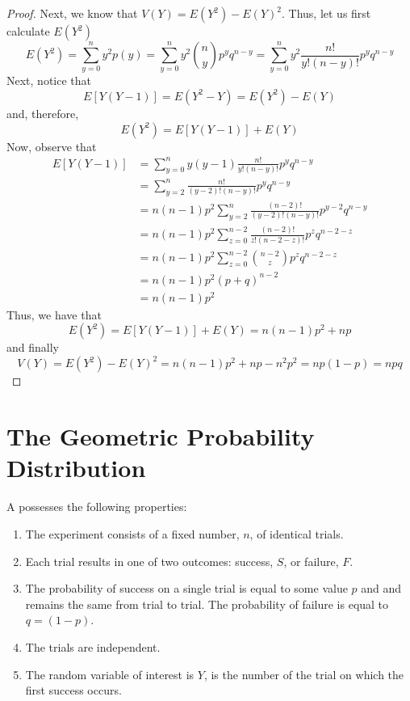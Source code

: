 \documentclass[12pt, a4paper, twoside, openright, titlepage]{book}
\begin{document}
\begin{proof}{}{}
    Next, we know that $V(Y) = E(Y^2) - E(Y)^2$. Thus, let us first calculate $E(Y^2)$ \begin{equation*}
        E(Y^2) = \sum\limits_{y=0}^ny^2p(y) = \sum\limits_{y=0}^ny^2\binom{n}{y}p^yq^{n-y} = \sum\limits_{y=0}^ny^2\frac{n!}{y!(n-y)!}p^yq^{n-y}
    \end{equation*}
    Next, notice that \begin{equation*}
        E[Y(Y-1)] = E(Y^2-Y) = E(Y^2)-E(Y)
    \end{equation*}
    and, therefore, \begin{equation*}
        E(Y^2) = E[Y(Y-1)] + E(Y)
    \end{equation*}
    Now, observe that \begin{align*}
        E[Y(Y-1)] &= \sum\limits_{y=0}^ny(y-1)\frac{n!}{y!(n-y)!}p^yq^{n-y} \\
        &= \sum\limits_{y=2}^n\frac{n!}{(y-2)!(n-y)!}p^yq^{n-y} \\
        &= n(n-1)p^2\sum\limits_{y=2}^n\frac{(n-2)!}{(y-2)!(n-y)!}p^{y-2}q^{n-y} \\
        &= n(n-1)p^2\sum\limits_{z=0}^{n-2}\frac{(n-2)!}{z!(n-2-z)!}p^zq^{n-2-z} \\
        &= n(n-1)p^2\sum\limits_{z=0}^{n-2}\binom{n-2}{z}p^zq^{n-2-z} \\
        &= n(n-1)p^2(p+q)^{n-2} \\
        &= n(n-1)p^2
    \end{align*}
    Thus, we have that \begin{equation*}
        E(Y^2) = E[Y(Y-1)]+E(Y) = n(n-1)p^2+np
    \end{equation*}
    and finally \begin{equation*}
        V(Y) = E(Y^2)-E(Y)^2 = n(n-1)p^2+np-n^2p^2 = np(1-p) = npq
    \end{equation*}
\end{proof}


\section{\textsection The Geometric Probability Distribution}

\begin{defn}{}{}
    A  possesses the following properties: \begin{enumerate}
        \item The experiment consists of a fixed number, $n$, of identical trials.
        \item Each trial results in one of two outcomes: success, $S$, or failure, $F$.
        \item The probability of success on a single trial is equal to some value $p$ and and remains the same from trial to trial. The probability of failure is equal to $q = (1-p)$.
        \item The trials are independent.
        \item The random variable of interest is $Y$, is the number of the trial on which the first success occurs.
    \end{enumerate}
\end{defn}
\end{document}
